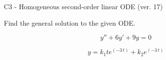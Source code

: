 \begin{exercise}
  \begin{exerciseTitle}C3 - Homogeneous second-order linear ODE (ver. 17)\end{exerciseTitle}
  \begin{exerciseStatement}
    
Find the general solution to the given ODE.

    
\[y''+6y'+9y = 0\]

  \end{exerciseStatement}
  \begin{exerciseAnswer}
    
\[y= k_{1} t e^{\left(-3 \, t\right)} + k_{2} e^{\left(-3 \, t\right)}\]

  \end{exerciseAnswer}
\end{exercise}